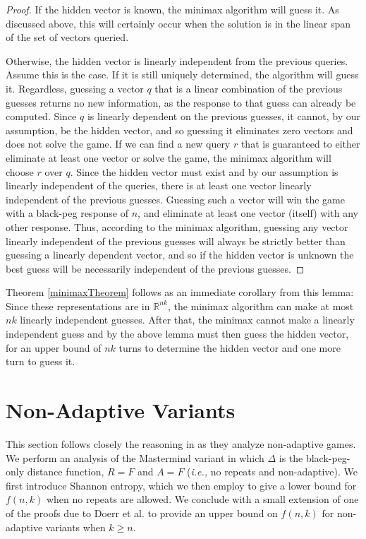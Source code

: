 \documentclass[12pt, a4paper]{article}
\newcommand{\R}{\mathbb{R}}           %
\begin{document}
\begin{proof}
	If the hidden vector is known, the minimax algorithm will guess it. As discussed above, this will certainly occur when the solution is in the linear span of the set of vectors queried.
	
	Otherwise, the hidden vector is linearly independent from the previous queries. Assume this is the case. If it is still uniquely determined, the algorithm will guess it. Regardless, guessing a vector $q$ that is a linear combination of the previous guesses returns no new information, as the response to that guess can already be computed. Since $q$ is linearly dependent on the previous guesses, it cannot, by our assumption, be the hidden vector, and so guessing it eliminates zero vectors and does not solve the game. If we can find a new query $r$ that is guaranteed to either eliminate at least one vector or solve the game, the minimax algorithm will choose $r$ over $q$. Since the hidden vector must exist and by our assumption is linearly independent of the queries, there is at least one vector linearly independent of the previous guesses. Guessing such a vector will win the game with a black-peg response of $n$, and eliminate at least one vector (itself) with any other response. Thus, according to the minimax algorithm, guessing any vector linearly independent of the previous guesses will always be strictly better than guessing a linearly dependent vector, and so if the hidden vector is unknown the best guess will be necessarily independent of the previous guesses.
\end{proof}
Theorem \ref{minimaxTheorem} follows as an immediate corollary from this lemma: Since these representations are in $\R^{nk}$, the minimax algorithm can make at most $nk$ linearly independent guesses. After that, the minimax cannot make a linearly independent guess and by the above lemma must then guess the hidden vector, for an upper bound of $nk$ turns to determine the hidden vector and one more turn to guess it.

\section{Non-Adaptive Variants}
This section follows closely the reasoning  in \cite{DS13} as they analyze non-adaptive games.  We perform an analysis of the Mastermind variant in which $\Delta$ is the black-peg-only distance function, $R=F$ and $A=F$ (\textit{i.e.,} no repeats and non-adaptive). We first introduce Shannon entropy, which we then employ to give a lower bound for $f(n,k)$ when no repeats are allowed. We conclude with a small extension of one of the proofs due to Doerr et al. to provide an upper bound on $f(n,k)$ for non-adaptive variants when $k\ge n$.
\end{document}
